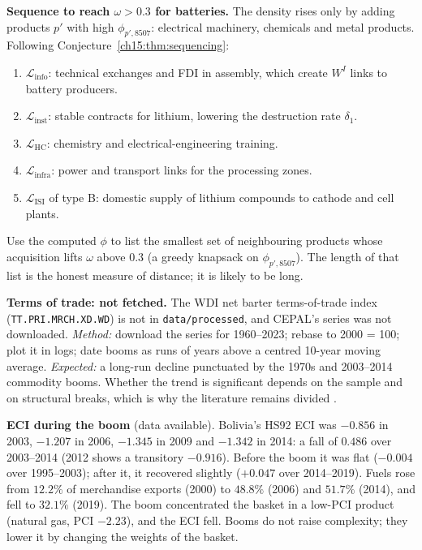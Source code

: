 \documentclass[../solutions_manual.tex]{subfiles}
\begin{document}
 \textbf{Sequence to reach $\omega > 0.3$ for batteries.} The density rises only by adding products $p'$ with high $\phi_{p',8507}$: electrical machinery, chemicals and metal products. Following Conjecture~\ref{ch15:thm:sequencing}:
\begin{enumerate}
\item $\mathcal{L}_{\text{info}}$: technical exchanges and FDI in assembly, which create $W^I$ links to battery producers.
\item $\mathcal{L}_{\text{inst}}$: stable contracts for lithium, lowering the destruction rate $\delta_1$.
\item $\mathcal{L}_{\text{HC}}$: chemistry and electrical-engineering training.
\item $\mathcal{L}_{\text{infra}}$: power and transport links for the processing zones.
\item $\mathcal{L}_{\text{ISI}}$ of type B: domestic supply of lithium compounds to cathode and cell plants.
\end{enumerate}
Use the computed $\phi$ to list the smallest set of neighbouring products whose acquisition lifts $\omega$ above $0.3$ (a greedy knapsack on $\phi_{p',8507}$). The length of that list is the honest measure of distance; it is likely to be long.


 \textbf{Terms of trade: not fetched.} The WDI net barter terms-of-trade index (\texttt{TT.PRI.MRCH.XD.WD}) is not in \nolinkurl{data/processed}, and CEPAL's series was not downloaded. \emph{Method:} download the series for 1960--2023; rebase to 2000 = 100; plot it in logs; date booms as runs of years above a centred 10-year moving average. \emph{Expected:} a long-run decline punctuated by the 1970s and 2003--2014 commodity booms. Whether the trend is significant depends on the sample and on structural breaks, which is why the literature remains divided \citep{grilli1988primary,harvey2010prebisch,arezki2014testing}.

 \textbf{ECI during the boom} (data available). Bolivia's HS92 ECI was $-0.856$ in 2003, $-1.207$ in 2006, $-1.345$ in 2009 and $-1.342$ in 2014: a fall of $0.486$ over 2003--2014 (2012 shows a transitory $-0.916$). Before the boom it was flat ($-0.004$ over 1995--2003); after it, it recovered slightly ($+0.047$ over 2014--2019). Fuels rose from $12.2\%$ of merchandise exports (2000) to $48.8\%$ (2006) and $51.7\%$ (2014), and fell to $32.1\%$ (2019). The boom concentrated the basket in a low-PCI product (natural gas, PCI $-2.23$), and the ECI fell. Booms do not raise complexity; they lower it by changing the weights of the basket.
\end{document}
